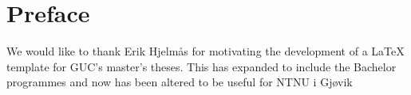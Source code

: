 \chapter*{Preface} %
\label{chap:preface}

We would like to thank Erik Hjelmås for motivating the development of a \LaTeX{} template
 for GUC's master's theses.  This has expanded to include the Bachelor programmes and now has been altered to be useful for NTNU i Gj\o{}vik
 
 
